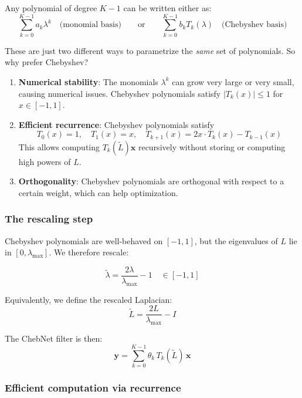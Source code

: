 \begin{notechapter}
Any polynomial of degree $K-1$ can be written either as:
\[
\sum_{k=0}^{K-1} a_k \lambda^k \quad \text{(monomial basis)}
\qquad \text{or} \qquad
\sum_{k=0}^{K-1} b_k T_k(\lambda) \quad \text{(Chebyshev basis)}
\]

These are just two different ways to parametrize the \emph{same} set
of polynomials. So why prefer Chebyshev?

\begin{enumerate}
\item \textbf{Numerical stability}: The monomials $\lambda^k$ can grow
      very large or very small, causing numerical issues. Chebyshev
      polynomials satisfy $|T_k(x)| \leq 1$ for $x \in [-1, 1]$.

\item \textbf{Efficient recurrence}: Chebyshev polynomials satisfy
      \[
      T_0(x) = 1, \quad T_1(x) = x, \quad
      T_{k+1}(x) = 2x \cdot T_k(x) - T_{k-1}(x)
      \]
      This allows computing $T_k(\tilde{L})\mathbf{x}$ recursively without
      storing or computing high powers of $L$.

\item \textbf{Orthogonality}: Chebyshev polynomials are orthogonal
      with respect to a certain weight, which can help optimization.
\end{enumerate}

\subsubsection{The rescaling step}

Chebyshev polynomials are well-behaved on $[-1, 1]$, but the eigenvalues
of $L$ lie in $[0, \lambda_{\max}]$. We therefore rescale:

\begin{equation}
\tilde{\lambda} = \frac{2\lambda}{\lambda_{\max}} - 1
\quad \in [-1, 1]
\end{equation}

Equivalently, we define the rescaled Laplacian:
\begin{equation}
\tilde{L} = \frac{2L}{\lambda_{\max}} - I
\end{equation}

The ChebNet filter is then:
\begin{equation}
\mathbf{y} = \sum_{k=0}^{K-1} \theta_k \, T_k(\tilde{L}) \, \mathbf{x}
\end{equation}

\subsubsection{Efficient computation via recurrence}


\end{notechapter}
